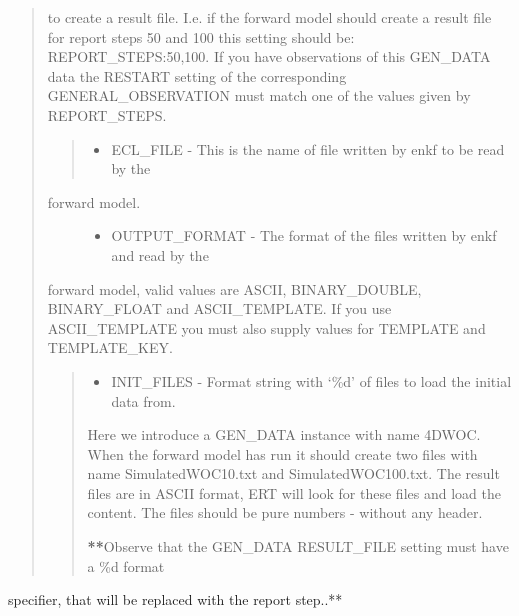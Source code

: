 \documentclass[letterpaper,10pt,english]{sphinxmanual}
\begin{document}
\begin{sphinxShadowBox}
\begin{quote}
\begin{itemize}
\end{itemize}

to create a result file. I.e. if the forward model should create a result
file for report steps 50 and 100 this setting should be:
REPORT\_STEPS:50,100. If you have observations of this GEN\_DATA data the
RESTART setting of the corresponding GENERAL\_OBSERVATION must match one of
the values given by REPORT\_STEPS.
\begin{quote}

\begin{itemize}
\item {} 
ECL\_FILE - This is the name of file written by enkf to be read by the

\end{itemize}
\end{quote}
\begin{description}
\item[{forward model.}] \leavevmode\begin{itemize}
\item {} 
OUTPUT\_FORMAT - The format of the files written by enkf and read by the

\end{itemize}

\end{description}

forward model, valid values are ASCII, BINARY\_DOUBLE, BINARY\_FLOAT and
ASCII\_TEMPLATE. If you use ASCII\_TEMPLATE you must also supply values for
TEMPLATE and TEMPLATE\_KEY.
\begin{quote}
\begin{itemize}
\item {} 
INIT\_FILES - Format string with ‘\%d’ of files to load the initial data from.

\end{itemize}


%
\begin{sphinxVerbatim}[commandchars=\\\{\}]
         
\end{sphinxVerbatim}

Here we introduce a GEN\_DATA instance with name 4DWOC. When the forward model
has run it should create two files with name SimulatedWOC10.txt and
SimulatedWOC100.txt. The result files are in ASCII format, ERT will look for
these files and load the content. The files should be pure numbers - without
any header.

{\color{red}\bfseries{}**}Observe that the GEN\_DATA RESULT\_FILE setting must have a \%d format
\end{quote}
\end{quote}

specifier, that will be replaced with the report step..**
\end{sphinxShadowBox}
\end{document}
